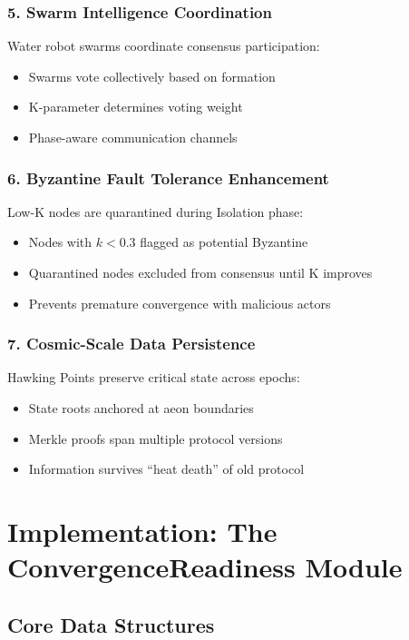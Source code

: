 \documentclass[12pt,a4paper]{article}
\begin{document}
\subsubsection{5. Swarm Intelligence Coordination}
Water robot swarms coordinate consensus participation:
\begin{itemize}
    \item Swarms vote collectively based on formation
    \item K-parameter determines voting weight
    \item Phase-aware communication channels
\end{itemize}

\subsubsection{6. Byzantine Fault Tolerance Enhancement}
Low-K nodes are quarantined during Isolation phase:
\begin{itemize}
    \item Nodes with $k < 0.3$ flagged as potential Byzantine
    \item Quarantined nodes excluded from consensus until K improves
    \item Prevents premature convergence with malicious actors
\end{itemize}

\subsubsection{7. Cosmic-Scale Data Persistence}
Hawking Points preserve critical state across epochs:
\begin{itemize}
    \item State roots anchored at aeon boundaries
    \item Merkle proofs span multiple protocol versions
    \item Information survives ``heat death'' of old protocol
\end{itemize}

\section{Implementation: The ConvergenceReadiness Module}

\subsection{Core Data Structures}
\end{document}
